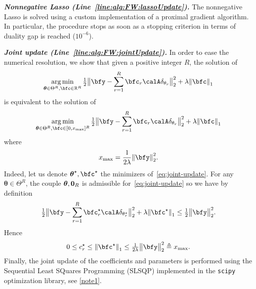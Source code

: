 \vspace*{1em}
\noindent
\textbf{\itshape Nonnegative Lasso (Line~\ref{line:alg:FW:lassoUpdate}).}
The nonnegative Lasso is solved using a custom implementation of a proximal gradient algorithm.
In particular, the procedure stops as soon as a stopping criterion in terms of duality gap is reached ($10^{-6}$).

\vspace*{1em}
\noindent
\textbf{\itshape Joint update (Line~\ref{line:alg:FW:jointUpdate}).}
In order to ease the numerical resolution, we show that given a positive integer $R$, the solution of
\begin{equation}
	\label{eq:joint-update}
	\kargmin_{\boldsymbol{\theta}\in\Theta^R,\bfc\in\kR^R} \tfrac{1}{2} \big\Vert{\bfy - \sum_{r=1}^R \bfc_r \opObs\spike{\theta_r}}\big\Vert_2^2 + \lambda\kvvbar{\bfc}_1
\end{equation}
is equivalent to the solution of
\begin{equation}
	\kargmin_{\boldsymbol{\theta}\in\Theta^R,\bfc\in[0, x_{\max}]^R} \tfrac{1}{2} \big\Vert{\bfy - \sum_{r=1}^R \bfc_r \opObs\spike{\theta_r}}\big\Vert_2^2 + \lambda\kvvbar{\bfc}_1
\end{equation}
where
\begin{equation}
	x_{\max} = \frac{1}{2\lambda} \kvvbar{\bfy}_2^2.
\end{equation}
Indeed, let us denote $\boldsymbol{\theta}^\star,\bfc^\star$ the minimizers of~\eqref{eq:joint-update}.
For any $\boldsymbol{\theta}\in\Theta^R$, the couple $\boldsymbol{\theta},\mathbf{0}_R$ is admissible for~\eqref{eq:joint-update} so we have by definition
\begin{equation}
	\tfrac{1}{2}\big\Vert{\bfy - \sum_{r=1}^R \bfc^\star_r \opObs\spike{\theta^\star_r}}\big\Vert_2^2 + \lambda\kvvbar{\bfc^\star}_1
	\leq
	\tfrac{1}{2} \big\Vert \bfy \big\Vert_2^2
	.
\end{equation}
Hence
\begin{equation}
	0 \leq c_r^\star \leq \kvvbar{\bfc^\star}_1 \leq \tfrac{1}{2\lambda} \big\Vert \bfy \big\Vert_2^2 \triangleq x_{\max}
		.
\end{equation}
Finally, the joint update of the coefficients and parameters is performed using the Sequential Least SQuares Programming (SLSQP) implemented in the \texttt{scipy} optimization library, see \cref{note1}.